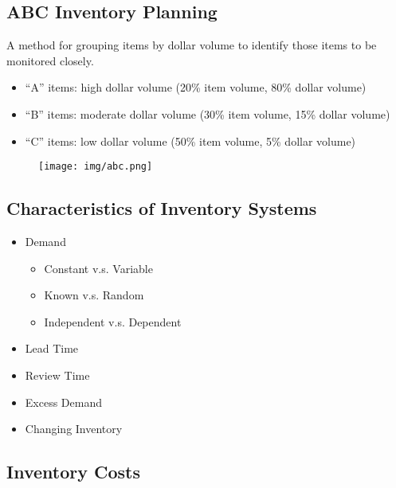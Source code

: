 \documentclass{article}
\begin{document}
\subsection{ABC Inventory Planning}

A method for grouping items by dollar volume to identify those items to be monitored closely.
\begin{itemize}
	\item ``A'' items: high dollar volume (20\% item volume, 80\% dollar volume)
	\item ``B'' items: moderate dollar volume (30\% item volume, 15\% dollar volume)
	\item ``C'' items: low dollar volume (50\% item volume, 5\% dollar volume)
\end{itemize}

\begin{figure}[H]
	\centering
	\texttt{[image: img/abc.png]}
\end{figure}

\subsection{Characteristics of Inventory Systems}

\begin{itemize}
	\item Demand
	      \begin{itemize}
		      \item Constant v.s. Variable
		      \item Known v.s. Random
		      \item Independent v.s. Dependent
	      \end{itemize}
	\item Lead Time
	\item Review Time
	\item Excess Demand
	\item Changing Inventory
\end{itemize}

\subsection{Inventory Costs}
\end{document}
